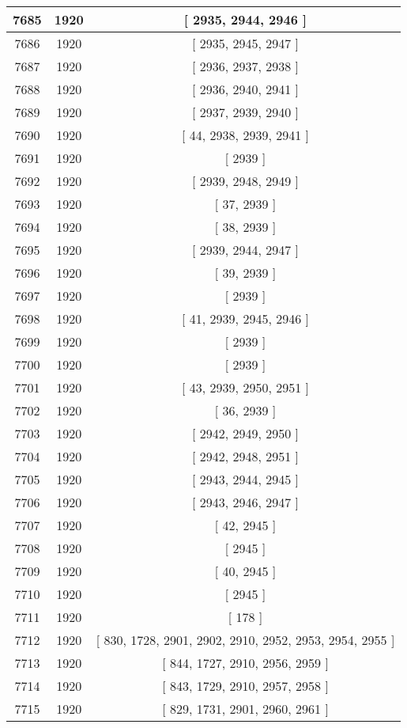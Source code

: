 \begin{center}
\begin{longtable}[H]{|| c c c ||}
\hline
7685 & 1920 & [ 2935, 2944, 2946 ] \\ 
\hline
7686 & 1920 & [ 2935, 2945, 2947 ] \\ 
\hline
7687 & 1920 & [ 2936, 2937, 2938 ] \\ 
\hline
7688 & 1920 & [ 2936, 2940, 2941 ] \\ 
\hline
7689 & 1920 & [ 2937, 2939, 2940 ] \\ 
\hline
7690 & 1920 & [ 44, 2938, 2939, 2941 ] \\ 
\hline
7691 & 1920 & [ 2939 ] \\ 
\hline
7692 & 1920 & [ 2939, 2948, 2949 ] \\ 
\hline
7693 & 1920 & [ 37, 2939 ] \\ 
\hline
7694 & 1920 & [ 38, 2939 ] \\ 
\hline
7695 & 1920 & [ 2939, 2944, 2947 ] \\ 
\hline
7696 & 1920 & [ 39, 2939 ] \\ 
\hline
7697 & 1920 & [ 2939 ] \\ 
\hline
7698 & 1920 & [ 41, 2939, 2945, 2946 ] \\ 
\hline
7699 & 1920 & [ 2939 ] \\ 
\hline
7700 & 1920 & [ 2939 ] \\ 
\hline
7701 & 1920 & [ 43, 2939, 2950, 2951 ] \\ 
\hline
7702 & 1920 & [ 36, 2939 ] \\ 
\hline
7703 & 1920 & [ 2942, 2949, 2950 ] \\ 
\hline
7704 & 1920 & [ 2942, 2948, 2951 ] \\ 
\hline
7705 & 1920 & [ 2943, 2944, 2945 ] \\ 
\hline
7706 & 1920 & [ 2943, 2946, 2947 ] \\ 
\hline
7707 & 1920 & [ 42, 2945 ] \\ 
\hline
7708 & 1920 & [ 2945 ] \\ 
\hline
7709 & 1920 & [ 40, 2945 ] \\ 
\hline
7710 & 1920 & [ 2945 ] \\ 
\hline
7711 & 1920 & [ 178 ] \\ 
\hline
7712 & 1920 & [ 830, 1728, 2901, 2902, 2910, 2952, 2953, 2954, 2955 ] \\ 
\hline
7713 & 1920 & [ 844, 1727, 2910, 2956, 2959 ] \\ 
\hline
7714 & 1920 & [ 843, 1729, 2910, 2957, 2958 ] \\ 
\hline
7715 & 1920 & [ 829, 1731, 2901, 2960, 2961 ] \\ 

\end{longtable}
\end{center}
